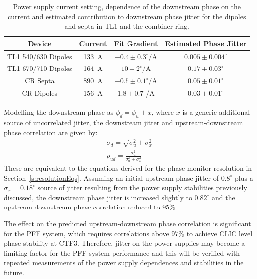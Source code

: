 \begin{table}
  \begin{center}
    \begin{tabular}{| c c c c |}
	   \hline
       Device & Current & Fit Gradient & Estimated Phase Jitter \\ \hline
       TL1 540/630 Dipoles & 133~A & \(-0.4\pm0.3^\circ\)/A & \(0.005\pm0.004^\circ\)\\
       TL1 670/710 Dipoles & 164~A & \(10\pm2^\circ\)/A & \(0.17\pm0.03^\circ\)\\
       CR Septa & 890~A &  \(-0.5\pm0.1^\circ\)/A & \(0.05\pm0.01^\circ\)\\
       CR Dipoles & 156~A & \(1.8\pm0.7^\circ\)/A & \(0.03\pm0.01^\circ\)\\ \hline 
    \end{tabular}
    \caption{Power supply current setting, dependence of the downstream phase on the current and estimated contribution to downstream phase jitter for the dipoles and septa in TL1 and the combiner ring.}
  	\label{t:otherJitSources}
  \end{center}
\end{table}

Modelling the downstream phase as \(\phi_d = \phi_u + x\), where \(x\) is a generic additional source of uncorrelated jitter, the downstream jitter and upstream-downstream phase correlation are given by:
\begin{eqnarray}
\sigma_d = \sqrt{\sigma_u^2 + \sigma_x^2} \\
\rho_{ud} = \frac{\sigma_u^2}{\sigma_u^2 + \sigma_x^2}
\end{eqnarray}
These are equivalent to the equations derived for the phase monitor resolution in Section~\ref{s:resolutionEqs}. Assuming an initial upstream phase jitter of \(0.8^\circ\) plus a \(\sigma_x = 0.18^\circ\) source of jitter resulting from the power supply stabilities previously discussed, the downstream phase jitter is increased slightly to \(0.82^\circ\) and the upstream-downstream phase correlation reduced to \(95\%\).

The effect on the predicted upstream-downstream phase correlation is significant for the PFF system, which requires correlations above \(97\%\) to achieve CLIC level phase stability at CTF3. Therefore, jitter on the power supplies may become a limiting factor for the PFF system performance and this will be verified with repeated measurements of the power supply dependences and stabilities in the future.

